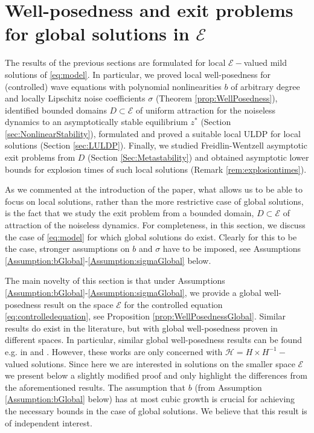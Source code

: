 \documentclass[10pt, reqno]{amsart}
\newcommand{\h}{\mathcal{H}}
\newcommand{\e}{\mathcal{E}}
\theoremstyle{definition}
\numberwithin{lem}{section}
\numberwithin{cor}{section}
\numberwithin{prop}{section}
\numberwithin{thm}{section}
\numberwithin{dfn}{section}
\begin{document}
\section{Well-posedness and exit problems for global solutions in $\e$}\label{sec:GlobalSolutions}


The results of the previous sections are formulated for local $\e-$valued mild solutions of \eqref{eq:model}. In particular, we proved local well-posedness for (controlled) wave equations with polynomial nonlinearities $b$ of arbitrary degree and locally Lipschitz noise coefficients $\sigma$ (Theorem \ref{prop:WellPosedness}), identified bounded domains $D\subset\e$ of uniform attraction for the noiseless dynamics to an asymptotically stable equilibrium $z^*$ (Section \ref{sec:NonlinearStability}), formulated and proved a suitable local ULDP for local solutions (Section \ref{sec:LULDP}). Finally, we studied Freidlin-Wentzell asymptotic exit problems from $D$ (Section \ref{Sec:Metastability}) and obtained asymptotic lower bounds for explosion times of such local solutions (Remark \ref{rem:explosiontimes}).

As we commented at the introduction of the paper, what allows us to be able to focus on local solutions, rather than the more restrictive case of global solutions, is the fact that we study the exit problem from a bounded domain, $D\subset\e$ of attraction of the noiseless dynamics. For completeness, in this section, we discuss the case of \eqref{eq:model} for which global solutions do exist. Clearly for this to be the case, stronger assumptions on $b$ and $\sigma$ have to be imposed, see Assumptions \ref{Assumption:bGlobal}-\ref{Assumption:sigmaGlobal} below.

The main novelty of this section is that under Assumptions \ref{Assumption:bGlobal}-\ref{Assumption:sigmaGlobal}, we provide a global well-posedness result on the space $\e$ for the controlled equation \eqref{eq:controlledequation}, see Proposition \ref{prop:WellPosednessGlobal}. Similar results do exist in the literature, but with global well-posedness proven in different spaces. In particular, similar global well-posedness results can be found e.g. in \cite[Proof of Theorem 5.3]{cerrai2003stochastic} and \cite[Theorem 4.2]{cerrai2006smoluchowski}. However, these works are only concerned with $\h=H\times H^{-1}-$valued solutions. Since here we are interested in solutions on the smaller space $\e$ we present below a slightly modified proof and only highlight the differences from the aforementioned results. The assumption that $b$ (from Assumption \ref{Assumption:bGlobal} below) has at most cubic growth is crucial for achieving the necessary bounds in the case of global solutions. We believe that this result is of independent interest.
\end{document}
